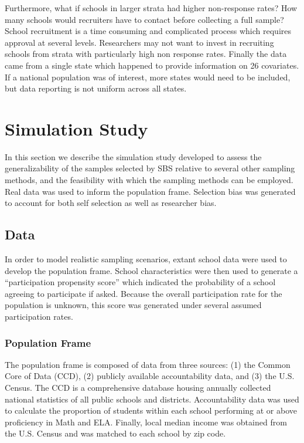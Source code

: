 \documentclass[man,floatsintext]{apa6}
\begin{document}
Furthermore, what if schools in larger strata had higher non-response rates? How many schools would recruiters have to contact before collecting a full sample? School recruitment is a time consuming and complicated process which requires approval at several levels. Researchers may not want to invest in recruiting schools from strata with particularly high non response rates. Finally the data came from a single state which happened to provide information on 26 covariates. If a national population was of interest, more states would need to be included, but data reporting is not uniform across all states.

\hypertarget{simulation-study}{%
\section{Simulation Study}\label{simulation-study}}

In this section we describe the simulation study developed to assess the generalizability of the samples selected by SBS relative to several other sampling methods, and the feasibility with which the sampling methods can be employed. Real data was used to inform the population frame.
Selection bias was generated to account for both self selection as well as researcher bias.

\hypertarget{data}{%
\subsection{Data}\label{data}}

In order to model realistic sampling scenarios, extant school data were used to develop the population frame. School characteristics were then used to generate a \enquote{participation propensity score} which indicated the probability of a school agreeing to participate if asked. Because the overall participation rate for the population is unknown, this score was generated under several assumed participation rates.

\hypertarget{population-frame}{%
\subsubsection{Population Frame}\label{population-frame}}

The population frame is composed of data from three sources: (1) the Common Core of Data (CCD), (2) publicly available accountability data, and (3) the U.S. Census. The CCD is a comprehensive database housing annually collected national statistics of all public schools and districts. Accountability data was used to calculate the proportion of students within each school performing at or above proficiency in Math and ELA. Finally, local median income was obtained from the U.S. Census and was matched to each school by zip code.
\end{document}
